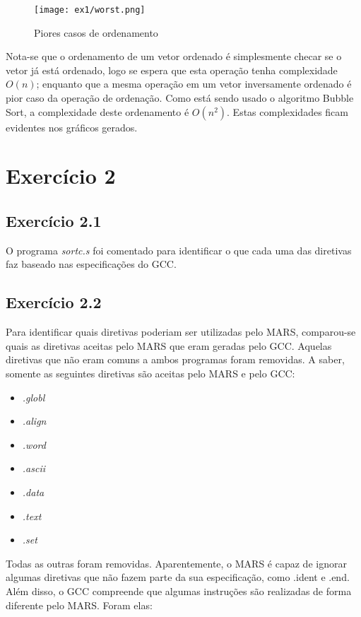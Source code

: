 \documentclass[12pt, a4paper, twoside]{article}
\begin{document}
\begin{figure}
    \centering
    \texttt{[image: ex1/worst.png]}
    \caption{Piores casos de ordenamento}
\end{figure}

Nota-se que o ordenamento de um vetor ordenado é simplesmente checar se o vetor já está ordenado, logo se espera que esta operação tenha complexidade $O(n)$; enquanto que a mesma operação em um vetor inversamente ordenado é pior caso da operação de ordenação. Como está sendo usado o algoritmo Bubble Sort, a complexidade deste ordenamento é $O(n^2)$. Estas complexidades ficam evidentes nos gráficos gerados.

\section{Exercício 2}

\subsection{Exercício 2.1}

O programa \textit{sortc.s} foi comentado para identificar o que cada uma das diretivas faz baseado nas especificações do GCC.

\subsection{Exercício 2.2}

Para identificar quais diretivas poderiam ser utilizadas pelo MARS, comparou-se quais as diretivas aceitas pelo MARS que eram geradas pelo GCC. Aquelas diretivas que não eram comuns a ambos programas foram removidas. A saber, somente as seguintes diretivas são aceitas pelo MARS e pelo GCC:

\begin{itemize}
    \item \textit{.globl}
    \item \textit{.align}
    \item \textit{.word}
    \item \textit{.ascii}
    \item \textit{.data}
    \item \textit{.text}
    \item \textit{.set}
\end{itemize}

Todas as outras foram removidas. Aparentemente, o MARS é capaz de ignorar algumas diretivas que não fazem parte da sua especificação, como .ident e .end. Além disso, o GCC compreende que algumas instruções são realizadas de forma diferente pelo MARS. Foram elas:
\end{document}
